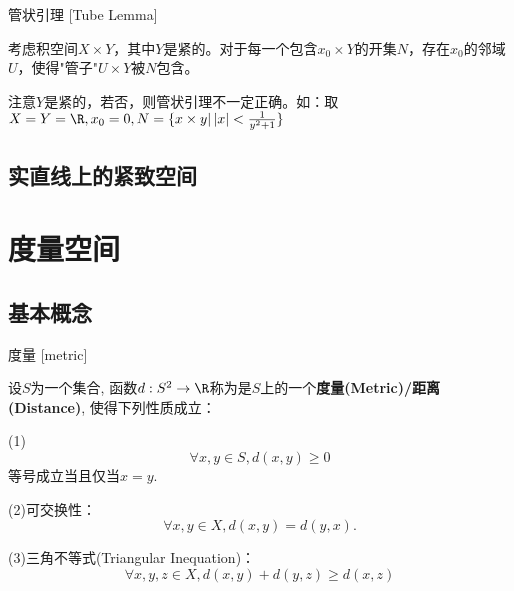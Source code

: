 \documentclass[UTF8]{ctexart}
\begin{document}
            \begin{thm}
                {管状引理}
                [Tube Lemma]

                考虑积空间\(X\times Y\)，其中\(Y\)是紧的。对于每一个包含\(x_0\times Y\)的开集\(N\)，存在\(x_0\)的邻域\(U\)，使得"管子"\(U\times Y\)被\(N\)包含。

                注意\(Y\)是紧的，若否，则管状引理不一定正确。如：取\(X=Y=\R,x_0=0,N=\{x\times y|\left|x\right|<\frac{1}{y^2+1}\}\)
            \end{thm}

        \subsection{实直线上的紧致空间}
            
                

    \section{度量空间}
        
        \subsection{基本概念}
            
            \begin{dfn}
                {度量}
                [metric]

                设$S$为一个集合, 函数$d:S^2\to\R$称为是$S$上的一个\textbf{度量(Metric)/距离(Distance)}, 使得下列性质成立：

                (1)\[\forall x,y\in S, d(x,y)\geq0\]
                等号成立当且仅当$x=y$.

                (2)可交换性：
                \[\forall x,y\in X, d(x,y)=d(y,x).\]

                (3)三角不等式(Triangular Inequation)：
                \[\forall x,y,z\in X, d(x,y)+d(y,z)\geq d(x,z)\]
            \end{dfn}
            
\end{document}
